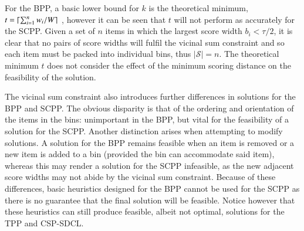 \documentclass[authoryear]{elsarticle}
\begin{document}
For the BPP, a basic lower bound for $k$ is the theoretical minimum, $t = \lceil\sum_{i=1}^{n} w_i / W\rceil$ \citep{martello1990l}, however it can be seen that $t$ will not perform as accurately for the SCPP. Given a set of $n$ items in which the largest score width $b_i < \tau / 2$, it is clear that no pairs of score widths will fulfil the vicinal sum constraint and so each item must be packed into individual bins, thus $|\mathcal{S}| = n$. The theoretical minimum $t$ does not consider the effect of the minimum scoring distance on the feasibility of the solution.

The vicinal sum constraint also introduces further differences in solutions for the BPP and SCPP. The obvious disparity is that of the ordering and orientation of the items in the bins: unimportant in the BPP, but vital for the feasibility of a solution for the SCPP. Another distinction arises when attempting to modify solutions. A solution for the BPP remains feasible when an item is removed or a new item is added to a bin (provided the bin can accommodate said item), whereas this may render a solution for the SCPP infeasible, as the new adjacent score widths may not abide by the vicinal sum constraint. Because of these differences, basic heuristics designed for the BPP cannot be used for the SCPP as there is no guarantee that the final solution will be feasible. Notice however that these heuristics can still produce feasible, albeit not optimal, solutions for the TPP and CSP-SDCL.


\begin{comment}
\begin{figure}[H]	
	\centering
	
	\caption{An infeasible solution produced using FFD for an example instance of the SCPP. Here, $|\mathcal{I}| = 15$, $W = 1000$, and $\tau = 70$. \scpp{$A(\mathcal{I}) = 5268$, therefore $t = 6$, shaded is unused material, item widths in middle of items.}}	
	\label{fig:ffd}
\end{figure}
\end{comment}
\end{document}
